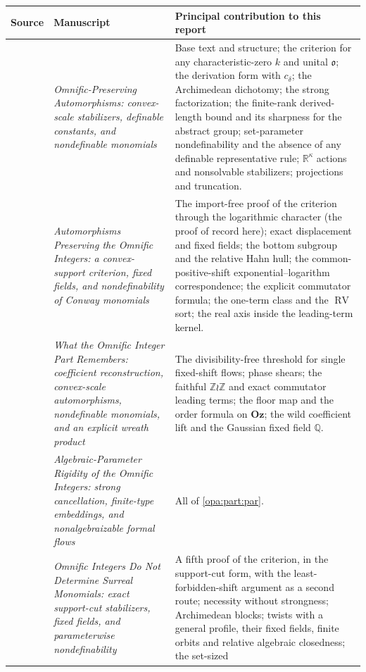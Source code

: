 \documentclass[11pt,oneside]{article}
\numberwithin{equation}{section}
\theoremstyle{definition}
\theoremstyle{remark}
\newcommand{\Oz}{\mathbf{Oz}}
\newcommand{\R}{\mathbb R}
\newcommand{\Q}{\mathbb Q}
\newcommand{\Z}{\mathbb Z}
\newcommand{\oo}{\mathfrak o}
\newcommand{\RV}{\operatorname{RV}}
\begin{document}
\begin{center}
\renewcommand{\arraystretch}{1.2}
\begin{longtable}{>{\raggedright\arraybackslash}p{}>{\raggedright\arraybackslash}p{}>{\raggedright\arraybackslash}p{}}
\toprule
Source & Manuscript & Principal contribution to this report\\
\midrule
\endhead
09 & \emph{Omnific-Preserving Automorphisms: convex-scale stabilizers,
definable constants, and nondefinable monomials} &
Base text and structure; the criterion for any characteristic-zero $k$ and
unital $\oo$; the derivation form with $c_\delta$; the Archimedean
dichotomy; the strong factorization; the finite-rank derived-length bound
and its sharpness for the abstract group; set-parameter nondefinability and
the absence of any definable representative rule; $\R^\kappa$ actions and
nonsolvable stabilizers; projections and truncation.\\
04 & \emph{Automorphisms Preserving the Omnific Integers: a convex-support
criterion, fixed fields, and nondefinability of Conway monomials} &
The import-free proof of the criterion through the logarithmic character
(the proof of record here); exact displacement and fixed fields; the bottom
subgroup and the relative Hahn hull; the common-positive-shift
exponential--logarithm correspondence; the explicit commutator formula;
the one-term class and the $\RV$ sort; the real axis inside the
leading-term kernel.\\
08 & \emph{What the Omnific Integer Part Remembers: coefficient
reconstruction, convex-scale automorphisms, nondefinable monomials, and an
explicit wreath product} &
The divisibility-free threshold for single fixed-shift flows; phase shears;
the faithful $\Z\wr\Z$ and exact commutator leading terms; the floor map and
the order formula on $\Oz$; the wild coefficient lift and the Gaussian fixed
field $\Q$.\\
02 & \emph{Algebraic-Parameter Rigidity of the Omnific Integers: strong
cancellation, finite-type embeddings, and nonalgebraizable formal flows} &
All of \cref{opa:part:par}.\\
10 & \emph{Omnific Integers Do Not Determine Surreal Monomials: exact
support-cut stabilizers, fixed fields, and parameterwise nondefinability} &
A fifth proof of the criterion, in the support-cut form, with the
least-forbidden-shift argument as a second route; necessity without
strongness; Archimedean blocks; twists with a general profile, their fixed
fields, finite orbits and relative algebraic closedness; the set-sized

\end{longtable}
\end{center}
\end{document}
